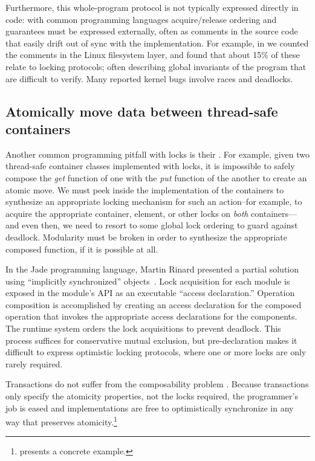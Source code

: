Furthermore, this whole-program protocol is not typically expressed
directly in code: with common programming languages acquire/release
ordering and guarantees must be expressed externally, often as
comments in the source code that easily drift out of sync with the
implementation.  For example, in \cite{AnanianAsKuLeLi05} we counted
the comments in the Linux filesystem layer, and found that about 15\%
of these relate to locking protocols; often describing global
invariants of the program that are difficult to verify.  Many
reported kernel bugs involve races and deadlocks.


\subsection{Atomically move data between thread-safe containers}
Another common programming pitfall with locks is their
.
For example, given two thread-safe
container classes implemented with locks, it is impossible to
safely compose
the \textit{get} function of one with the \textit{put} function of
the another to create an atomic move.  We must peek inside the
implementation of the containers to synthesize an appropriate locking
mechanism for such an action--for example, to acquire the 
appropriate
container, element, or other
locks on \emph{both} containers---and even then,
we need to resort to some global lock ordering to guard against
deadlock.  Modularity must be broken in order to synthesize the
appropriate composed function, if it is possible at all.

In the Jade programming language, Martin Rinard presented a partial
solution using ``implicitly synchronized''
objects~\cite[p14]{Rinard98}.  Lock acquisition for each module is
exposed in the module's API as an executable ``access declaration.''
Operation composition is accomplished by creating an access
declaration for the composed operation that invokes the appropriate
access declarations for the components.  The runtime system orders the
lock acquisitions to prevent deadlock.  This process suffices for
conservative mutual exclusion, but pre-declaration makes it difficult
to express optimistic locking protocols, where one or more locks are
only rarely required.

Transactions do not suffer from the composability problem
\cite{HarrisMaPeHe05}.  Because transactions only specify the atomicity
properties, not the locks required, the programmer's job is eased and
implementations are free to optimistically synchronize in any way that
preserves atomicity.\footnote{ presents a concrete example.}

